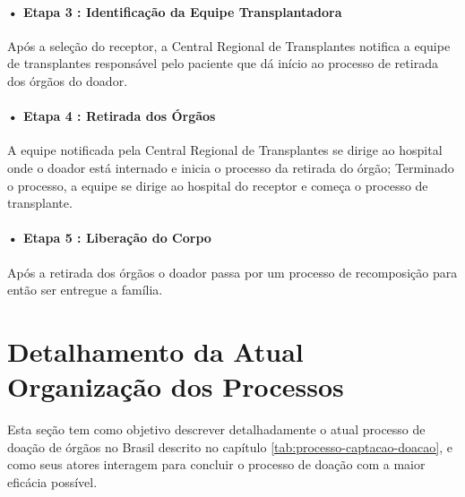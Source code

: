 \documentclass[portuguese,oneside]{tcc}
\begin{document}
\paragraph*{• Etapa 3 : Identificação da Equipe Transplantadora}
Após a seleção do receptor, a Central Regional de Transplantes notifica a equipe de transplantes responsável pelo paciente que dá início ao processo de retirada dos órgãos do doador.

\paragraph*{• Etapa 4 : Retirada dos Órgãos}
A equipe notificada pela Central Regional de Transplantes se dirige ao hospital onde o doador está internado e inicia o processo da retirada do órgão; Terminado o processo, a equipe se dirige ao hospital do receptor e começa o processo de transplante.

\paragraph*{• Etapa 5 : Liberação do Corpo}
Após a retirada dos órgãos o doador passa por um processo de recomposição para então ser entregue a família.


\section{Detalhamento da Atual Organização dos Processos}  \label{tab:detalhamento-atual}
Esta seção tem como objetivo descrever detalhadamente o atual processo de doação de órgãos no Brasil descrito no capítulo \ref{tab:processo-captacao-doacao}, e como seus atores interagem para concluir o processo de doação com a maior eficácia possível.
\end{document}
